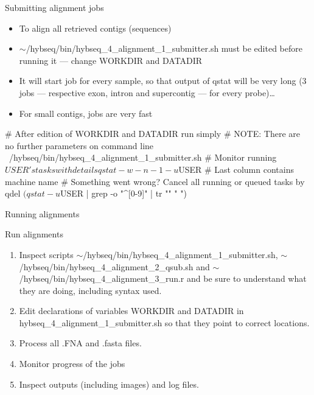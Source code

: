 \documentclass[compress,  xelatex, 11pt, xcolor=x11names, aspectratio=169,
	hyperref={
		bookmarks=true,
		unicode=true,
		colorlinks=true,
		pdftitle={HybSeq course},
		plainpages=false,
		pdfauthor={Vojtech Zeisek},
		pdfsubject={Practical processing of HybSeq target enrichment sequencing data on computing grids like MetaCentrum},
		pdfcreator={XeLaTeX},
		pdfkeywords={BASH, command line, GNU, HybSeq, Linux, MetaCentrum, sequencing shell, target enrichment},
		linkcolor=Turquoise4, %
		anchorcolor=DodgerBlue4, %
		citecolor=DodgerBlue4, %
		filecolor=DodgerBlue4, %
		menucolor=Tan4, %
		urlcolor=DarkOliveGreen4 %
		},
	url={hyphens, lowtilde} %
	]{beamer}
\renewcommand{\texttt}[1]{\colorbox{Cornsilk2}{{\ttfamily #1}}}
\renewcommand{\alert}[1]{\textcolor{OrangeRed3}{#1}}
\begin{document}
\begin{frame}[fragile]{Submitting alignment jobs}
	\begin{itemize}
		\item To align all retrieved contigs (sequences)
		\item \alert{\texttt{$\sim$/hybseq/bin/hybseq\_4\_alignment\_1\_submitter.sh} must be edited before running it --- change \texttt{WORKDIR} and \texttt{DATADIR}}
		\item It will start job for every sample, so that output of \texttt{qstat} will be very long (3 jobs --- respective exon, intron and supercontig --- for every probe)\ldots
		\item For small contigs, jobs are very fast
	\end{itemize}
	\begin{bashcode}
    # After edition of WORKDIR and DATADIR run simply
    # NOTE: There are no further parameters on command line
    ~/hybseq/bin/hybseq_4_alignment_1_submitter.sh
    # Monitor running $USER's tasks with details
    qstat -w -n -1 -u $USER # Last column contains machine name
    # Something went wrong? Cancel all running or queued tasks by
    qdel $(qstat -u $USER | grep -o "^[0-9]\+" | tr "\n" " ")
	\end{bashcode}
\end{frame}

\begin{frame}{Running alignments}
	\begin{exampleblock}{Run alignments}
		\begin{enumerate}
			\item Inspect scripts \texttt{$\sim$/hybseq/bin/hybseq\_4\_alignment\_1\_submitter.sh}, \texttt{$\sim$/hybseq/bin/hybseq\_4\_alignment\_2\_qsub.sh} and \texttt{$\sim$/hybseq/bin/hybseq\_4\_alignment\_3\_run.r} and be sure to understand what they are doing, including syntax used.
			\item Edit declarations of variables \texttt{WORKDIR} and \texttt{DATADIR} in \texttt{hybseq\_4\_alignment\_1\_submitter.sh} so that they point to correct locations.
			\item Process all \texttt{*.FNA} and \texttt{*.fasta} files.
			\item Monitor progress of the jobs
			\item Inspect outputs (including images) and log files.
		\end{enumerate}
	\end{exampleblock}
\end{frame}
\end{document}
